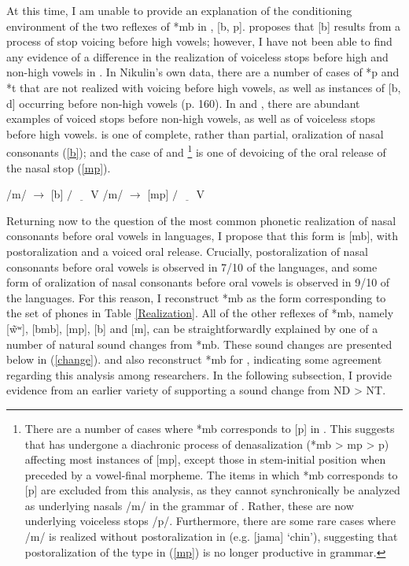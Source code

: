 \documentclass[output=paper,hidelinks]{langscibook}
\begin{document}
{At this time, I am unable to provide an explanation of the conditioning environment of the two reflexes of *mb in , [b, p]. \citet{Nikulin2017} proposes that  [b] results from a process of stop voicing before high vowels; however, I have not been able to find any evidence of a difference in the realization of voiceless stops before high and non-high vowels in . In Nikulin's own data, there are a number of cases of  *p and *t that are not realized with voicing before high vowels, as well as instances of [b, d] occurring before non-high vowels (p. 160). In \citet{Quintino2000} and \citet{Pickering2010}, there are abundant examples of voiced stops before non-high vowels, as well as of voiceless stops before high vowels.} is one of complete, rather than partial, oralization of nasal consonants (\ref{b}); and the case of  and \footnote{There are a number of cases where  *mb corresponds to [p] in . This suggests that  has undergone a diachronic process of denasalization (*mb > mp > p) affecting most instances of [mp], except those in stem-initial position when preceded by a vowel-final morpheme. The items in which  *mb corresponds to  [p] are excluded from this analysis, as they cannot synchronically be analyzed as underlying nasals /m/ in the grammar of . Rather, these are now underlying voiceless stops /p/. Furthermore, there are some rare cases where /m/ is realized without postoralization in  (e.g. [jama] `chin'), suggesting that postoralization of the type in (\ref{mp}) is no longer productive in  grammar.
}
 is one of devoicing of the oral release of the nasal stop (\ref{mp}). 

\begin{multicols}{2}
\ea\label{b} /m/ $\rightarrow$ [b] $/$ $\underline{\hspace{1em}}$ V \z
\ea\label{mp} /m/ $\rightarrow$ [mp] $/$ $\underline{\hspace{1em}}$ V \z
\end{multicols}



Returning now to the question of the most common phonetic realization of nasal consonants before oral vowels in  languages, I propose that this form is [mb], with postoralization and a voiced oral release. Crucially, postoralization of nasal consonants before oral vowels is observed in 7/10 of the  languages, and some form of oralization of nasal consonants before oral vowels is observed in 9/10 of the  languages. For this reason, I reconstruct *mb as the  form corresponding to the set of phones in Table \ref{Realization}. All of the other reflexes of *mb, namely [\~wʷ], [bmb], [mp], [b] and [m], can be straightforwardly explained by one of a number of natural sound changes from *mb. These sound changes are presented below in (\ref{change}). \citet{Nikulin2016, Nikulin2017} and \citet{Davis1966} also reconstruct *mb for , indicating some agreement regarding this analysis among  researchers. In the following subsection, I provide evidence from an earlier variety of  supporting a sound change from ND > NT.
\end{document}
